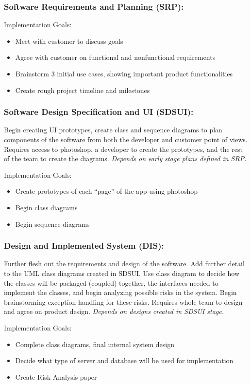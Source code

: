 \documentclass[12pt]{article}
\begin{document}
\subsubsection{Software Requirements and Planning (SRP):}
Implementation Goals:
\begin{itemize}
  \item Meet with customer to discuss goals
  \item Agree with customer on functional and nonfunctional requirements
  \item Brainstorm 3 initial use cases, showing important product functionalities
  \item Create rough project timeline and milestones
\end{itemize}

\subsubsection{Software Design Specification and UI (SDSUI):}
Begin creating UI prototypes, create class and sequence diagrams to plan
components of the software from both the developer and customer point of views.
Requires access to photoshop, a developer to create the prototypes, and the rest
of the team to create the diagrams. \textit{Depends on early stage plans defined in SRP.}

Implementation Goals:
\begin{itemize}
  \item Create prototypes of each “page” of the app using photoshop
  \item Begin class diagrams
  \item Begin sequence diagrams
\end{itemize}

\subsubsection{Design and Implemented System (DIS):}
Further flesh out the requirements and design of the software. Add further
detail to the UML class diagrams created in SDSUI. Use class diagram to decide
how the classes will be packaged (coupled) together, the interfaces needed to
implement the classes, and begin analyzing possible risks in the system. Begin
brainstorming exception handling for these risks. Requires whole team to design
and agree on product design. \textit{Depends on designs created in SDSUI stage.}

Implementation Goals:
\begin{itemize}
  \item Complete class diagrams, final internal system design
  \item Decide what type of server and database will be used for implementation
  \item Create Risk Analysis paper
\end{itemize}
\end{document}
